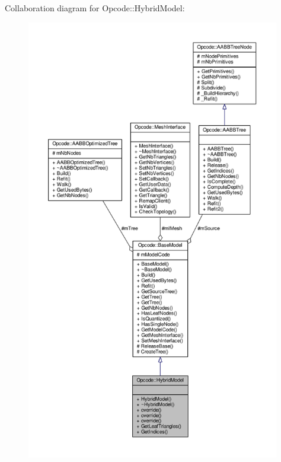 Collaboration diagram for Opcode\+:\+:Hybrid\+Model\+:
\nopagebreak
\begin{figure}[H]
\begin{center}
\leavevmode
\includegraphics[height=550pt]{df/dc1/classOpcode_1_1HybridModel__coll__graph}
\end{center}
\end{figure}
